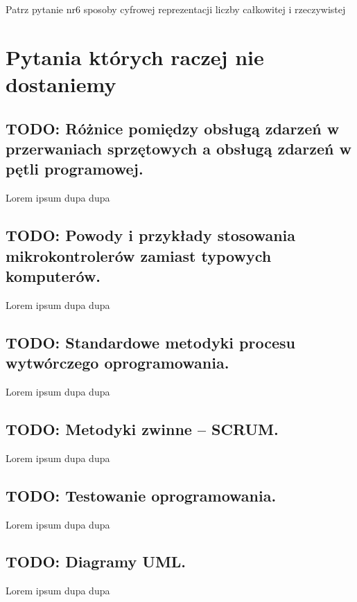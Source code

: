 \documentclass[a4paper,12pt,oneside]{book}
\begin{document}
		    Patrz pytanie nr6 sposoby cyfrowej reprezentacji liczby całkowitej i rzeczywistej
		
	\chapter{Pytania których raczej nie dostaniemy}
	
	\setcounter{section}{27}
	\section{\color{red} TODO: Różnice pomiędzy obsługą zdarzeń w przerwaniach sprzętowych a obsługą zdarzeń w pętli programowej.}
					
					Lorem ipsum dupa dupa
	
	\setcounter{section}{28}
	\section{\color{red} TODO: Powody i przykłady stosowania mikrokontrolerów zamiast typowych komputerów. }
					
					Lorem ipsum dupa dupa
	
	\setcounter{section}{38}
	\section{\color{red} TODO: Standardowe metodyki procesu wytwórczego oprogramowania. }
					
					Lorem ipsum dupa dupa
	
	\setcounter{section}{39}
	\section{\color{red} TODO: Metodyki zwinne – SCRUM. }
					
					Lorem ipsum dupa dupa
	
	\setcounter{section}{40}
	\section{\color{red} TODO: Testowanie oprogramowania. }
					
					Lorem ipsum dupa dupa
	
	\setcounter{section}{41}
	\section{\color{red} TODO: Diagramy UML. }
					
					Lorem ipsum dupa dupa
	
\end{document}
